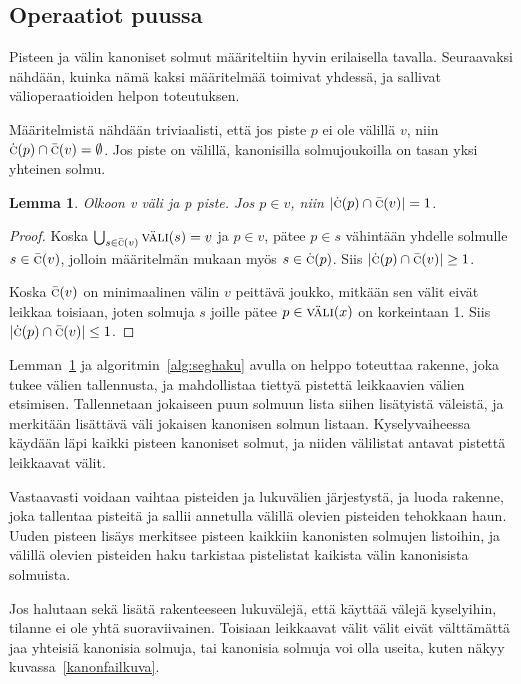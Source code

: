 \documentclass[finnish]{tktltiki2}
\newtheorem{lem}[lau]{Lemma}
\theoremstyle{definition}
\theoremstyle{remark}
\newcommand\size[1]{\ensuremath{\left |#1\right |}\xspace}
\newcommand\inter[1]{\ensuremath{\textsc{väli}(#1)}\xspace}
\newcommand\canon[1]{\ensuremath{\bar{\textsc{c}}(#1)}\xspace}
\newcommand\canonp[1]{\ensuremath{\dot{\textsc{c}}(#1)}\xspace}
\begin{document}
\subsection{Operaatiot puussa}

Pisteen ja välin kanoniset solmut määriteltiin hyvin erilaisella tavalla.
Seuraavaksi nähdään, kuinka nämä kaksi määritelmää toimivat yhdessä, ja sallivat välioperaatioiden helpon toteutuksen.

Määritelmistä nähdään triviaalisti, että jos piste $p$ ei ole välillä $v$, niin $\canonp{p}\cap\canon{v}=\emptyset$. Jos piste on välillä, kanonisilla solmujoukoilla on tasan yksi yhteinen solmu.

\begin{lem}\label{leikkaus1}
Olkoon v väli ja p piste. Jos $p\in v$, niin $\size{\canonp{p}\cap\canon{v}}=1$.\end{lem}
\begin{proof}
Koska $\bigcup_{s\in\canon{v}}\inter{s}=v$ ja $p\in v$, pätee $p\in s$ vähintään yhdelle solmulle $s\in\canon{v}$, jolloin määritelmän mukaan myös $s\in\canonp{p}$.
Siis $\size{\canonp{p}\cap\canon{v}}\ge 1$.

Koska $\canon{v}$ on minimaalinen välin $v$ peittävä joukko, mitkään sen välit eivät leikkaa toisiaan, joten solmuja $s$ joille pätee $p\in\inter{x}$ on korkeintaan 1.
Siis $\size{\canonp{p}\cap\canon{v}}\le 1$.
\end{proof}

Lemman~\ref{leikkaus1} ja algoritmin~\ref{alg:seghaku} avulla on helppo toteuttaa rakenne, joka tukee välien tallennusta, ja mahdollistaa tiettyä pistettä leikkaavien välien etsimisen.
Tallennetaan jokaiseen puun solmuun lista siihen lisätyistä väleistä, ja merkitään lisättävä väli jokaisen kanonisen solmun listaan.
Kyselyvaiheessa käydään läpi kaikki pisteen kanoniset solmut, ja niiden välilistat antavat pistettä leikkaavat välit.

Vastaavasti voidaan vaihtaa pisteiden ja lukuvälien järjestystä, ja luoda rakenne, joka tallentaa pisteitä ja sallii annetulla välillä olevien pisteiden tehokkaan haun.
Uuden pisteen lisäys merkitsee pisteen kaikkiin kanonisten solmujen listoihin, ja välillä olevien pisteiden haku tarkistaa pistelistat kaikista välin kanonisista solmuista.

Jos halutaan sekä lisätä rakenteeseen lukuvälejä, että käyttää välejä kyselyihin, tilanne ei ole yhtä suoraviivainen.
Toisiaan leikkaavat välit välit eivät välttämättä jaa yhteisiä kanonisia solmuja, tai kanonisia solmuja voi olla useita, kuten näkyy kuvassa~\ref{kanonfailkuva}.
\end{document}
